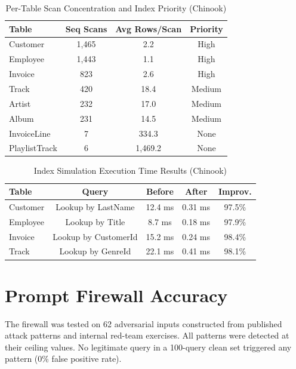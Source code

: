 \documentclass[12pt,a4paper]{report}
\begin{document}
\begin{table}[htbp]
\caption{Per-Table Scan Concentration and Index Priority (Chinook)}
\label{tab:scans}
\centering
\begin{tabular}{lccc}
\toprule
\textbf{Table} & \textbf{Seq Scans} & \textbf{Avg Rows/Scan} & \textbf{Priority} \\
\midrule
Customer     & 1,465 & 2.2      & High \\
Employee     & 1,443 & 1.1      & High \\
Invoice      & 823   & 2.6      & High \\
Track        & 420   & 18.4     & Medium \\
Artist       & 232   & 17.0     & Medium \\
Album        & 231   & 14.5     & Medium \\
InvoiceLine  & 7     & 334.3    & None \\
PlaylistTrack & 6   & 1,469.2  & None \\
\bottomrule
\end{tabular}
\end{table}

\begin{table}[htbp]
\caption{Index Simulation Execution Time Results (Chinook)}
\label{tab:idxsim}
\centering
\begin{tabular}{lcccc}
\toprule
\textbf{Table} & \textbf{Query} & \textbf{Before} & \textbf{After} & \textbf{Improv.} \\
\midrule
Customer & Lookup by LastName   & 12.4 ms & 0.31 ms & 97.5\% \\
Employee & Lookup by Title      & 8.7 ms  & 0.18 ms & 97.9\% \\
Invoice  & Lookup by CustomerId & 15.2 ms & 0.24 ms & 98.4\% \\
Track    & Lookup by GenreId    & 22.1 ms & 0.41 ms & 98.1\% \\
\bottomrule
\end{tabular}
\end{table}

\section{Prompt Firewall Accuracy}

The firewall was tested on 62 adversarial inputs constructed from published attack patterns \cite{perez2022ignore,greshake2023indirect} and internal red-team exercises. All patterns were detected at their ceiling values. No legitimate query in a 100-query clean set triggered any pattern (0\% false positive rate).
\end{document}
